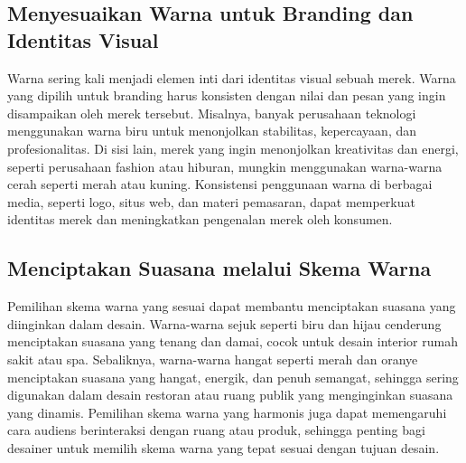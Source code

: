 \documentclass[a4paper]{article}
\begin{document}
\subsection{Menyesuaikan Warna untuk Branding dan Identitas Visual}
Warna sering kali menjadi elemen inti dari identitas visual sebuah merek. Warna yang dipilih untuk branding harus konsisten dengan nilai dan pesan yang ingin disampaikan oleh merek tersebut. Misalnya, banyak perusahaan teknologi menggunakan warna biru untuk menonjolkan stabilitas, kepercayaan, dan profesionalitas. Di sisi lain, merek yang ingin menonjolkan kreativitas dan energi, seperti perusahaan fashion atau hiburan, mungkin menggunakan warna-warna cerah seperti merah atau kuning. Konsistensi penggunaan warna di berbagai media, seperti logo, situs web, dan materi pemasaran, dapat memperkuat identitas merek dan meningkatkan pengenalan merek oleh konsumen.


\subsection{Menciptakan Suasana melalui Skema Warna}
Pemilihan skema warna yang sesuai dapat membantu menciptakan suasana yang diinginkan dalam desain. Warna-warna sejuk seperti biru dan hijau cenderung menciptakan suasana yang tenang dan damai, cocok untuk desain interior rumah sakit atau spa. Sebaliknya, warna-warna hangat seperti merah dan oranye menciptakan suasana yang hangat, energik, dan penuh semangat, sehingga sering digunakan dalam desain restoran atau ruang publik yang menginginkan suasana yang dinamis. Pemilihan skema warna yang harmonis juga dapat memengaruhi cara audiens berinteraksi dengan ruang atau produk, sehingga penting bagi desainer untuk memilih skema warna yang tepat sesuai dengan tujuan desain.
\end{document}
